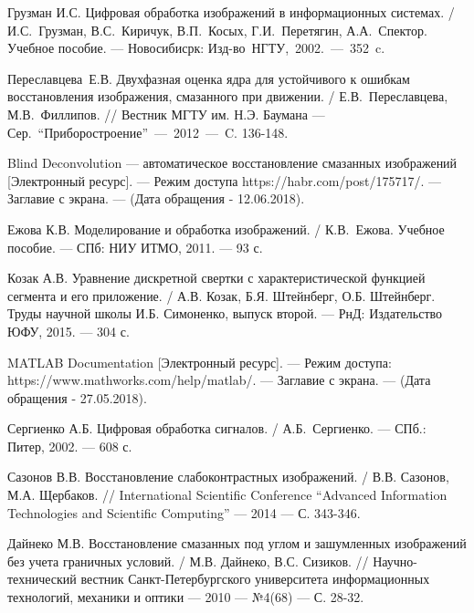 \documentclass[a4paper]{article}
\theoremstyle{definition}
\begin{document}
\begin{thebibliography}{9}
Грузман И.С. Цифровая обработка изображений в информационных системах. / И.С.~Грузман, В.С.~Киричук, В.П.~Косых, Г.И.~Перетягин, А.А.~Спектор. Учебное пособие. --- Новосибисрк: Изд-во~НГТУ,~2002.~---~352~c.

Переславцева~Е.В. Двухфазная оценка ядра для устойчивого к ошибкам восстановления изображения, смазанного при движении. / Е.В.~Переславцева, М.В.~Филлипов. // Вестник МГТУ им. Н.Э. Баумана --- Сер.~``Приборостроение''~---~2012~---~C. 136-148.

Blind Deconvolution --- автоматическое восстановление смазанных изображений [Электронный ресурс]. --- Режим доступа https://habr.com/post/175717/. --- Заглавие с экрана. --- (Дата обращения - 12.06.2018).

Ежова К.В. Моделирование и обработка изображений. / К.В.~Ежова. Учебное пособие. --- СПб: НИУ ИТМО, 2011. --- 93 с.

Козак А.В. Уравнение дискретной свертки с характеристической функцией сегмента и его приложение. / А.В. Козак, Б.Я. Штейнберг, О.Б. Штейнберг. Труды научной школы И.Б. Симоненко, выпуск второй. --- РнД: Издательство ЮФУ, 2015. --- 304 с.

MATLAB Documentation [Электронный ресурс]. --- Режим доступа: https://www.mathworks.com/help/matlab/. --- Заглавие с экрана. --- (Дата обращения - 27.05.2018).

Сергиенко А.Б. Цифровая обработка сигналов. / А.Б.~Сергиенко. --- СПб.: Питер, 2002. --- 608 с.

Сазонов В.В. Восстановление слабоконтрастных изображений. / В.В. Сазонов, М.А. Щербаков. // International Scientific Conference
``Advanced Information Technologies and Scientific Computing'' --- 2014 --- С. 343-346.

Дайнеко М.В. Восстановление смазанных под углом и зашумленных изображений без учета граничных условий. / М.В. Дайнеко, В.С. Сизиков. // Научно-технический вестник Санкт-Петербургского университета информационных технологий, механики и оптики --- 2010 --- №4(68) --- С. 28-32.

\end{thebibliography}
\end{document}
